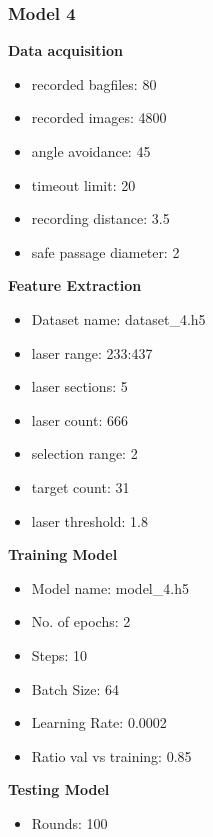 \subsubsection{Model 4\label{model_4} }
\begin{multicols}{2}\textbf{Data acquisition}
\begin{itemize}
\setlength\itemsep{0.1em}
\item recorded bagfiles: 80
\item recorded images: 4800
\item angle avoidance: 45
\item timeout limit: 20
\item recording distance: 3.5
\item safe passage diameter: 2
\end{itemize}
\textbf{Feature Extraction}
\begin{itemize}
\setlength\itemsep{0.1em}
\item Dataset name: dataset\_4.h5
\item  laser range: 233:437
\item  laser sections: 5
\item  laser count: 666
\item  selection range: 2
\item  target count: 31
\item  laser threshold: 1.8
\end{itemize}
\columnbreak\textbf{Training Model}
\begin{itemize}
\setlength\itemsep{0.1em}
\item  Model name: model\_4.h5
\item  No. of epochs: 2
\item  Steps: 10
\item  Batch Size: 64
\item  Learning Rate: 0.0002
\item  Ratio val vs training: 0.85
\end{itemize}
\textbf{Testing Model}
\begin{itemize}
\setlength\itemsep{0.1em}
\item Rounds: 100
\newline
\newline
\newline
\newline
\newline
\newline
\newline
\newline
\end{itemize}

\end{multicols}
